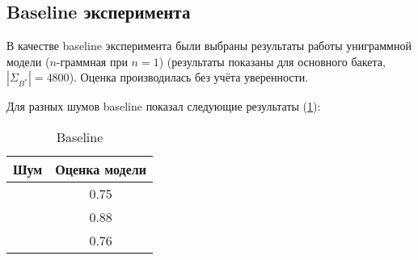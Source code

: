 \subsection{ Baseline эксперимента }

В качестве baseline эксперимента были выбраны результаты работы униграммной модели ($n$-граммная при $n = 1$) (результаты показаны для основного бакета, $|\Sigma_{B^*}| = 4800$). Оценка производилась без учёта уверенности.

Для разных шумов baseline показал следующие результаты (\cref{table:baseline}):

\begin{table}[H]
\begin{center}
\begin{tabular}{|c|c|} \hline
	Шум 	& Оценка модели \\ \hline
	\KG	& 0.75  \\
	\BS & 0.88  \\
	\MX & 0.76 \\ \hline
\end{tabular}
\caption{Baseline}
\label{table:baseline}
\end{center}
\end{table}